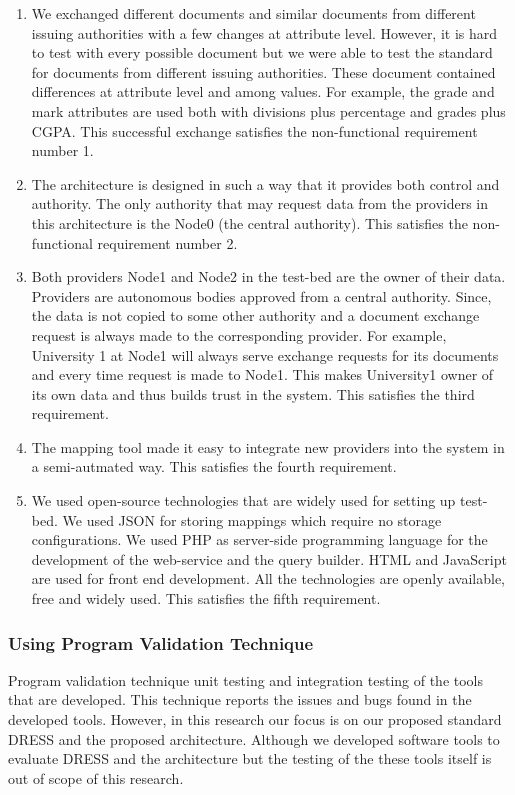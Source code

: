 \documentclass[12pt,a4paper,oneside]{book}
\begin{document}
	\begin{enumerate}  

		\item We exchanged different documents and similar documents from different issuing authorities with a few changes at attribute level. However, it is hard to test with every possible document but we were able to test the standard for documents from different issuing authorities. These document contained differences at attribute level and among values. For example, the grade and mark attributes are used both with divisions plus percentage and grades plus CGPA. This successful exchange satisfies the non-functional requirement number 1.

		\item The architecture is designed in such a way that it provides both control and authority. The only authority that may request data from the providers in this architecture is the Node0 (the central authority). This satisfies the non-functional requirement number 2. 
	
		\item Both providers Node1 and Node2 in the test-bed are the owner of their data. Providers are autonomous bodies approved from a central authority. Since, the data is not copied to some other authority and a document exchange request is always made to the corresponding provider. For example, University 1 at Node1 will always serve exchange requests for its documents and every time request is made to Node1. This makes University1 owner of its own data and thus builds trust in the system. This satisfies the third requirement.
		
		\item The mapping tool made it easy to integrate new providers into the system in a semi-autmated way. This satisfies the fourth requirement. 
		
		\item We used open-source technologies that are widely used for setting up test-bed. We used JSON for storing mappings which require no storage configurations. We used PHP as server-side programming language for the development of the web-service and the query builder. HTML and JavaScript are used for front end development. All the technologies are openly available, free and widely used. This satisfies the fifth requirement.

	\end{enumerate}
		
		
		\subsubsection{Using Program Validation Technique}
		Program validation technique unit testing and integration testing of the tools that are developed. This technique reports the issues and bugs found in the developed tools. However, in this research our focus is on our proposed standard DRESS and the proposed architecture. Although we developed software tools to evaluate DRESS and the architecture but the testing of the these tools itself is out of scope of this research. 
		
\end{document}
